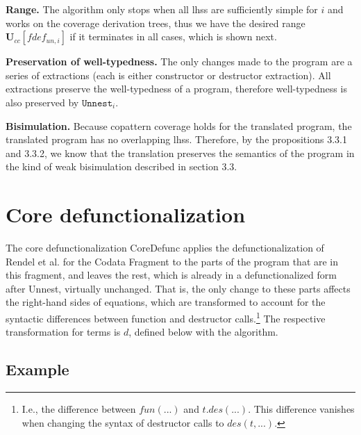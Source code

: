 \textbf{Range.} The algorithm only stops when all lhss are sufficiently simple for $i$ and works on the coverage derivation trees, thus we have the desired range $\mathbf{U}_{cc}[fdef_{un,i}]$ if it terminates in all cases, which is shown next.

\textbf{Preservation of well-typedness.} The only changes made to the program are a series of extractions (each is either constructor or destructor extraction). All extractions preserve the well-typedness of a program, therefore well-typedness is also preserved by $\texttt{Unnest}_i$.

\textbf{Bisimulation.} Because copattern coverage holds for the translated program, the translated program has no overlapping lhss. Therefore, by the propositions 3.3.1 and 3.3.2, we know that the translation preserves the semantics of the program in the kind of weak bisimulation described in section 3.3.

\section{Core defunctionalization}

The core defunctionalization \textsf{CoreDefunc} applies the defunctionalization of Rendel et al. for the Codata Fragment to the parts of the program that are in this fragment, and leaves the rest, which is already in a defunctionalized form after \textsf{Unnest}, virtually unchanged. That is, the only change to these parts affects the right-hand sides of equations, which are transformed to account for the syntactic differences between function and destructor calls.\footnote{I.e., the difference between $fun(...)$ and $t.des(...)$. This difference vanishes when changing the syntax of destructor calls to $des(t, ...)$.} The respective transformation for terms is $d$, defined below with the algorithm.

\subsection{Example}

